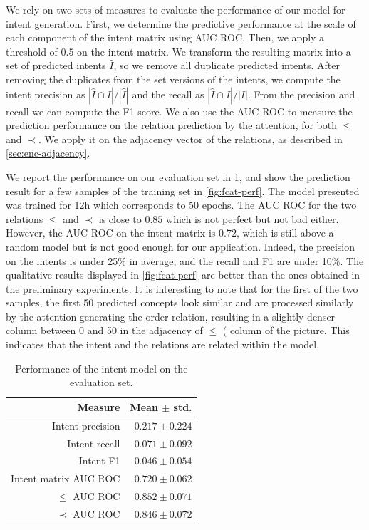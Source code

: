 We rely on two sets of measures to evaluate the performance of our model for intent generation.
First, we determine the predictive performance at the scale of each component of the intent matrix using AUC ROC.
Then, we apply a threshold of $0.5$ on the intent matrix.
We transform the resulting matrix into a set of predicted intents $\hat{I}$, so we remove all duplicate predicted intents.
After removing the duplicates from the set versions of the intents, we compute the intent precision as ${|\hat{I}\cap I|}/{|\hat{I}|}$ and the recall as ${|\hat{I}\cap I|}/{|I|}$. From the precision and recall we can compute the F1 score.
%
We also use the AUC ROC to measure the prediction performance on the relation prediction by the attention, for both $\leq$ and $\prec$.
We apply it on the adjacency vector of the relations, as described in \cref{sec:enc-adjacency}.

We report the performance on our evaluation set in \cref{tab:fcat-perf}, and show the prediction result for a few samples of the training set in \cref{fig:fcat-perf}.
The model presented was trained for 12h which corresponds to 50 epochs.
The AUC ROC for the two relations $\leq$ and $\prec$ is close to $0.85$ which is not perfect but not bad either.
However, the AUC ROC on the intent matrix is $0.72$, which is still above a random model but is not good enough for our application.
Indeed, the precision on the intents is under 25\% in average, and the recall and F1 are under 10\%.
The qualitative results displayed in \cref{fig:fcat-perf} are better than the ones obtained in the preliminary experiments.
It is interesting to note that for the first of the two samples, the first 50 predicted concepts look similar and are processed similarly by the attention generating the order relation, resulting in a slightly denser column between 0 and 50 in the adjacency of $\leq$ ( column of the picture. This indicates that the intent and the relations are related within the model.


\begin{table}[t]
\centering
\begin{tabular}{rr}
\toprule
Measure & Mean $\pm$ std. \\
\midrule
Intent precision              & $ 0.217\pm 0.224 $ \\
Intent recall                 & $ 0.071\pm 0.092 $ \\
Intent F1                     & $ 0.046\pm 0.054 $ \\
\midrule
Intent matrix AUC ROC & $ 0.720\pm 0.062 $ \\
$\leq$ AUC ROC        & $ 0.852\pm 0.071 $ \\
$\prec$ AUC ROC       & $ 0.846\pm 0.072 $ \\
\bottomrule
\end{tabular}
\caption{Performance of the intent model on the evaluation set.}\label{tab:fcat-perf}
\end{table}

